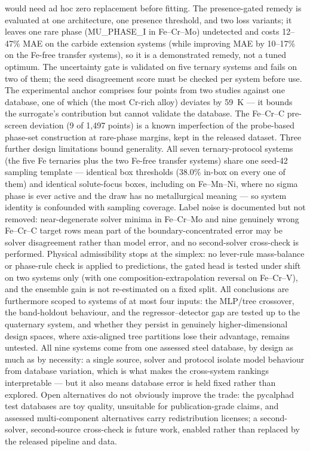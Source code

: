 \documentclass[preprint,12pt,authoryear]{elsarticle}
\begin{document}
would need ad hoc zero replacement before fitting. The presence-gated
remedy is evaluated at one architecture, one presence threshold, and two
loss variants; it leaves one rare phase (MU\_PHASE\_I in Fe--Cr--Mo)
undetected and costs 12--47\% MAE on the carbide extension systems
(while improving MAE by 10--17\% on the Fe-free transfer systems),
so it is a demonstrated remedy, not a tuned optimum. The uncertainty gate
is validated on five ternary systems and fails on two of them; the seed
disagreement score must be checked per system before use. The experimental
anchor comprises four points from two studies against one database, one
of which (the most Cr-rich alloy) deviates by 59~K --- it bounds the
surrogate's contribution but cannot validate the database. The Fe--Cr--C
pre-screen deviation (9 of 1{,}497 points) is a known imperfection of the
probe-based phase-set construction at rare-phase margins, kept in the
released dataset. Three further design limitations bound generality. All
seven ternary-protocol systems (the five Fe ternaries plus the two Fe-free
transfer systems) share one seed-42 sampling template --- identical
box thresholds (38.0\% in-box on every one of them) and identical
solute-focus boxes, including on Fe--Mn--Ni, where no sigma phase is ever
active and the draw has no metallurgical meaning --- so system identity is
confounded with sampling coverage. Label noise is documented but not
removed: near-degenerate solver minima in Fe--Cr--Mo and nine genuinely
wrong Fe--Cr--C target rows mean part of the boundary-concentrated error
may be solver disagreement rather than model error, and no second-solver
cross-check is performed. Physical admissibility stops at the simplex: no
lever-rule mass-balance or phase-rule check is applied to predictions, the
gated head is tested under shift on two systems only (with one
composition-extrapolation reversal on Fe--Cr--V), and the ensemble gain is not
re-estimated on a fixed split. All conclusions are furthermore scoped to systems of at
most four inputs: the MLP/tree crossover, the band-holdout behaviour, and
the regressor--detector gap are tested up to the quaternary system, and
whether they persist in genuinely higher-dimensional design spaces,
where axis-aligned tree partitions lose their advantage, remains
untested. All nine systems come from one assessed steel database, by
design as much as by necessity: a single source, solver and protocol
isolate model behaviour from database variation, which is what makes the
cross-system rankings interpretable --- but it also means database error
is held fixed rather than explored. Open alternatives do not obviously
improve the trade: the pycalphad test databases are toy quality,
unsuitable for publication-grade claims, and assessed multi-component
alternatives carry redistribution licenses; a second-solver, second-source
cross-check is future work, enabled rather than replaced by the released
pipeline and data.
\end{document}
